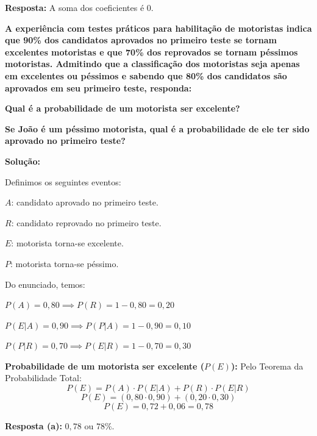 \documentclass[a4paper,10pt,landscape,twocolumn]{article}  %
\let\oldenumerate\enumerate
\let\oldendenumerate\endenumerate
\renewenvironment{enumerate}{%
  \oldenumerate%
  \setlength{\itemsep}{1pt}%
  \setlength{\parskip}{0pt}%
  \setlength{\parsep}{0pt}%
  \setlength{\topsep}{2pt}%
  \setlength{\partopsep}{0pt}%
}{%
  \oldendenumerate%
}
\let\olditemize\itemize
\let\oldenditemize\enditemize
\renewenvironment{itemize}{%
  \olditemize%
  \setlength{\itemsep}{1pt}%
  \setlength{\parskip}{0pt}%
  \setlength{\parsep}{0pt}%
  \setlength{\topsep}{2pt}%
  \setlength{\partopsep}{0pt}%
}{%
  \oldenditemize%
}
\begin{document}
\begin{enumerate}
    \textbf{Resposta:} A soma dos coeficientes é $0$.
	
    \item \textbf{A experiência com testes práticos para habilitação de motoristas indica que 90\% dos candidatos aprovados no primeiro teste se tornam excelentes motoristas e que 70\% dos reprovados se tornam péssimos motoristas. Admitindo que a classificação dos motoristas seja apenas em excelentes ou péssimos e sabendo que 80\% dos candidatos são aprovados em seu primeiro teste, responda:}
    \begin{enumerate}
        \item \textbf{Qual é a probabilidade de um motorista ser excelente?}
        \item \textbf{Se João é um péssimo motorista, qual é a probabilidade de ele ter sido aprovado no primeiro teste?}
    \end{enumerate}
    
    \textbf{Solução:}
    
    Definimos os seguintes eventos:
    \begin{itemize}
        \item $A$: candidato aprovado no primeiro teste.
        \item $R$: candidato reprovado no primeiro teste.
        \item $E$: motorista torna-se excelente.
        \item $P$: motorista torna-se péssimo.
    \end{itemize}
    
    Do enunciado, temos:
    \begin{itemize}
        \item $P(A) = 0,80 \implies P(R) = 1 - 0,80 = 0,20$
        \item $P(E|A) = 0,90 \implies P(P|A) = 1 - 0,90 = 0,10$
        \item $P(P|R) = 0,70 \implies P(E|R) = 1 - 0,70 = 0,30$
    \end{itemize}
    
    \begin{enumerate}
        \item \textbf{Probabilidade de um motorista ser excelente ($P(E)$):}
        Pelo Teorema da Probabilidade Total:
        \[ P(E) = P(A) \cdot P(E|A) + P(R) \cdot P(E|R) \]
        \[ P(E) = (0,80 \cdot 0,90) + (0,20 \cdot 0,30) \]
        \[ P(E) = 0,72 + 0,06 = 0,78 \]
        
        \textbf{Resposta (a):} $0,78$ ou $78\%$.
        

\end{enumerate}
\end{enumerate}
\end{document}
